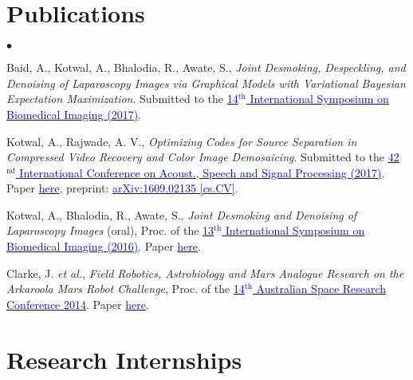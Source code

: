 \documentclass[margin,line]{res}
\newenvironment{list2}{
  \begin{list}{$\bullet$}{%
      \setlength{\itemsep}{0in}
      \setlength{\parsep}{0in} \setlength{\parskip}{0in}
      \setlength{\topsep}{0in} \setlength{\partopsep}{0in} 
      \setlength{\leftmargin}{0.2in}}}{\end{list}}
\begin{document}
\begin{resume}
\section{\sc Publications}
\begin{list2}
\item Baid, A., Kotwal, A., Bhalodia, R., Awate, S., {\em Joint Desmoking, Despeckling, and Denoising of Laparoscopy Images via Graphical Models with Variational Bayesian Expectation Maximization}. Submitted to the \href{http://biomedicalimaging.org/2017/}{\textcolor{blue} {14$^\text{th}$ International Symposium on Biomedical Imaging (2017)}}.
\item Kotwal, A., Rajwade, A. V., {\em Optimizing Codes for Source Separation in Compressed Video Recovery and Color Image Demosaicing}. Submitted to the \href{http://www.ieee-icassp2017.org/}{\textcolor{blue} {42$^\text{nd}$ International Conference on Acoust., Speech and Signal Processing (2017)}}. Paper \href{http://alankarkotwal.github.io/pubs/icassp17.pdf}{\textcolor{blue} {here}}, preprint: \href{https://arxiv.org/abs/1609.02135}{\textcolor{blue} {arXiv:1609.02135 [cs.CV]}}.
\item Kotwal, A., Bhalodia, R., Awate, S., {\em Joint Desmoking and Denoising of Laparoscopy Images} (oral), Proc. of the \href{http://biomedicalimaging.org/2016/}{\textcolor{blue} {13$^\text{th}$ International Symposium on Biomedical Imaging (2016)}}. Paper \href{http://alankarkotwal.github.io/pubs/isbi16.pdf}{\textcolor{blue} {here}}.
\item Clarke, J. {\em et al.}, {\em Field Robotics, Astrobiology and Mars Analogue Research on the Arkaroola Mars Robot Challenge}, Proc. of the \href{http://www.nssa.com.au/14asrc/14ASRC-proceedings.zip}{\textcolor{blue} {14$^\text{th}$ Australian Space Research Conference 2014}}. Paper \href{http://alankarkotwal.github.io/pubs/asrc14.pdf}{\textcolor{blue} {here}}.
\end{list2}

\section{\sc Research Internships} 


\end{resume}
\end{document}
